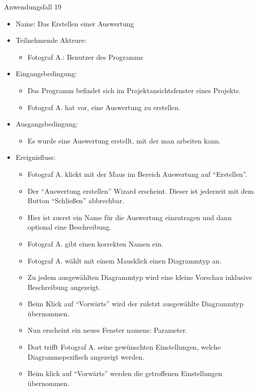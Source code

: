 \begin{itemize}
\begin{description}
\item[Anwendungsfall 19]
\end{description}
 
\begin{itemize}
\item Name: Das Erstellen einer Auswertung
\item Teilnehmende Akteure:
\begin{itemize}
\item Fotograf A.: Benutzer des Programms
\end{itemize}
\item Eingangsbedingung:
\begin{itemize}
\item Das Programm befindet sich im Projektansichtsfenster eines Projekts.
\item Fotograf A. hat vor, eine Auswertung zu erstellen.
\end{itemize}
\item Ausgangsbedingung:
\begin{itemize}
\item Es wurde eine Auswertung erstellt, mit der man arbeiten kann.
\end{itemize}
\item Ereignisfluss:
\begin{itemize}
\item Fotograf A. klickt mit der Maus im Bereich Auswertung auf "`Erstellen"'.
\item Der "`Auswertung erstellen"' Wizard erscheint. Dieser ist jederzeit mit dem Button "`Schließen"' abbrechbar.
\item Hier ist zuerst ein Name für die Auswertung einzutragen und dann optional eine Beschreibung.
\item Fotograf A. gibt einen korrekten Namen ein.
\item Fotograf A. wählt mit einem Mausklick einen Diagrammtyp an.
\item Zu jedem ausgewählten Diagrammtyp wird eine kleine Vorschau inklusive Beschreibung angezeigt.
\item Beim Klick auf "`Vorwärts"' wird der zuletzt ausgewählte Diagrammtyp übernommen.
\item Nun erscheint ein neues Fenster namens: Parameter.
\item Dort trifft Fotograf A. seine gewünschten Einstellungen, welche Diagrammspezifisch angezeigt werden. 
\item Beim klick auf "`Vorwärts"' werden die getroffenen Einstellungen übernommen.

\end{itemize}
\end{itemize}
\end{itemize}
